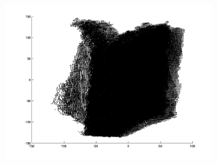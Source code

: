 \begin{figure}
\begin{subfigure}[b]{0.3\textwidth}
		\includegraphics[width=\textwidth]{Images/Book12.png}
		\caption{}
	\end{subfigure}	
	

\end{figure}
